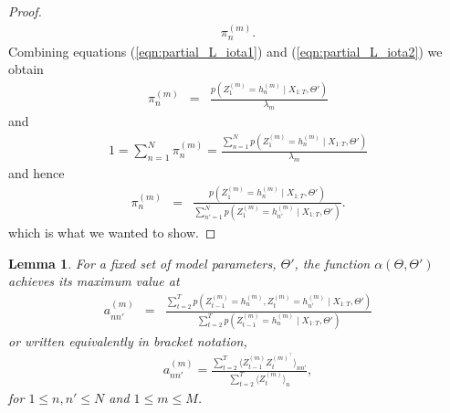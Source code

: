 \documentclass{amsart}
\newtheorem{lemma}[theorem]{Lemma}
\begin{document}
\begin{proof}
\begin{eqnarray}
\pi_n^{(m)}.
\end{eqnarray}
Combining equations (\ref{eqn:partial_L_iota1}) and 
(\ref{eqn:partial_L_iota2}) we obtain 
\begin{eqnarray*}
\pi_n^{(m)} &=& \frac{p(Z_1^{(m)} = h_n^{(m)}\mid 
X_{1:T},\Theta')}{\lambda_m}
\end{eqnarray*}
and
\begin{eqnarray*}
1 = \sum_{n=1}^N \pi_n^{(m)} = \frac{\sum_{n=1}^Np(Z_1^{(m)} = h_n^{(m)}\mid 
X_{1:T},\Theta')}{\lambda_m}
\end{eqnarray*}
and hence 
\begin{eqnarray*}
\pi_n^{(m)} &=& \frac{p(Z_1^{(m)} = h_n^{(m)}\mid 
X_{1:T},\Theta')}{\sum_{n'=1}^Np(Z_1^{(m)} = h_{n'}^{(m)}\mid 
X_{1:T},\Theta')}.
\end{eqnarray*}
which is what we wanted to show.
\end{proof}

%
%

\begin{lemma}\label{lemma:transition}
For a fixed set of model parameters, $\Theta'$, the function $\alpha(\Theta,\Theta')$ 
achieves its maximum value at
\begin{eqnarray*}
a_{nn'}^{(m)} & = & 
\frac{\sum_{t=2}^Tp(Z_{t-1}^{(m)}=h_n^{(m)},Z_{t}^{(m)}=h_{n'}^{(m)}\mid 
X_{1:T},\Theta')}{\sum_{t=2}^Tp(Z_{t-1}^{(m)}=h_{n}^{(m)}\mid 
X_{1:T},\Theta')}
\end{eqnarray*}
or written equivalently in bracket notation, 
\begin{eqnarray}\label{eqn:updatetransition}
a_{nn'}^{(m)} = \frac{\sum_{t=2}^T\langle 
Z_{t-1}^{(m)}Z_t^{(m)^\intercal}\rangle_{nn'}}{\sum_{t=2}^T\langle 
Z_t^{(m)}\rangle_n},
\end{eqnarray}
for $1\leq n,n'\leq N$ and $1\leq m\leq M$.
\end{lemma}
\end{document}
